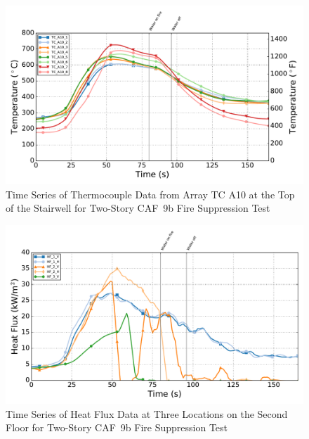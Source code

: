 \documentclass[12pt,oneside]{book}
\begin{document}
\begin{figure}[!ht]
	\includegraphics[width=.85\columnwidth]{../Figures/Script_Figures/Test_41c_West_061415_TC_A10}
	\caption{Time Series of Thermocouple Data from Array TC A10 at the Top of the Stairwell for Two-Story CAF~9b Fire Suppression Test}
	\label{fig:app_caf9b_tca10}
\end{figure}

\begin{figure}[!ht]
	\includegraphics[width=.85\columnwidth]{../Figures/Script_Figures/Test_41c_West_061415_Heat_Flux}
	\caption{Time Series of Heat Flux Data at Three Locations on the Second Floor for Two-Story CAF~9b Fire Suppression Test}
	\label{fig:app_caf9b_hf}
\end{figure}
\end{document}
